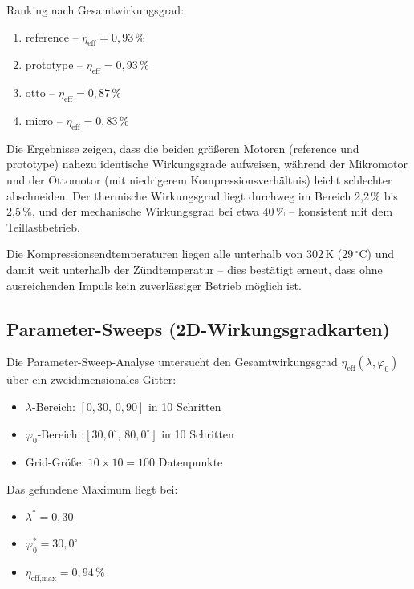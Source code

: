 ﻿\documentclass[a4paper,12pt]{article}
\begin{document}
Ranking nach Gesamtwirkungsgrad:
\begin{enumerate}
  \item reference -- $\eta_\text{eff} = 0{,}93\,\%$
  \item prototype -- $\eta_\text{eff} = 0{,}93\,\%$
  \item otto -- $\eta_\text{eff} = 0{,}87\,\%$
  \item micro -- $\eta_\text{eff} = 0{,}83\,\%$
\end{enumerate}

Die Ergebnisse zeigen, dass die beiden größeren Motoren (reference und prototype)
nahezu identische Wirkungsgrade aufweisen, während der Mikromotor und der
Ottomotor (mit niedrigerem Kompressionsverhältnis) leicht schlechter abschneiden.
Der thermische Wirkungsgrad liegt durchweg im Bereich 2{,}2\,\% bis 2{,}5\,\%,
und der mechanische Wirkungsgrad bei etwa 40\,\% -- konsistent mit dem
Teillastbetrieb.

Die Kompressionsendtemperaturen liegen alle unterhalb von $302\,\text{K}$
($29\,^\circ\text{C}$) und damit weit unterhalb der Zündtemperatur -- dies
bestätigt erneut, dass ohne ausreichenden Impuls kein zuverlässiger Betrieb
möglich ist.

\subsection{Parameter-Sweeps (2D-Wirkungsgradkarten)}

Die Parameter-Sweep-Analyse untersucht den Gesamtwirkungsgrad $\eta_\text{eff}(\lambda, \varphi_0)$
über ein zweidimensionales Gitter:

\begin{itemize}
  \item $\lambda$-Bereich: $[0{,}30,\, 0{,}90]$ in 10 Schritten
  \item $\varphi_0$-Bereich: $[30{,}0^\circ,\, 80{,}0^\circ]$ in 10 Schritten
  \item Grid-Größe: $10 \times 10 = 100$ Datenpunkte
\end{itemize}

Das gefundene Maximum liegt bei:

\begin{itemize}
  \item $\lambda^* = 0{,}30$
  \item $\varphi_0^* = 30{,}0^\circ$
  \item $\eta_\text{eff,max} = 0{,}94\,\%$
\end{itemize}
\end{document}
